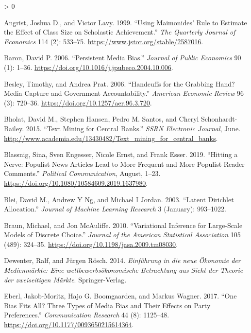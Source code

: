 \documentclass[
  12pt,
]{article}
\newlength{\cslhangindent}
\newenvironment{CSLReferences}[2] %
 {%
  \setlength{\parindent}{0pt}
  \ifodd #1 \everypar{\setlength{\hangindent}{\cslhangindent}}\ignorespaces\fi
  \ifnum #2 > 0
  \setlength{\parskip}{#2\baselineskip}
  \fi
 }%
 {}
\begin{document}
\hypertarget{refs}{}
\begin{CSLReferences}{1}{0}
\leavevmode\hypertarget{ref-angrist_using_1999}{}%
Angrist, Joshua D., and Victor Lavy. 1999. {``Using Maimonides' Rule to
Estimate the Effect of Class Size on Scholastic Achievement.''}
\emph{The Quarterly Journal of Economics} 114 (2): 533--75.
\url{https://www.jstor.org/stable/2587016}.

\leavevmode\hypertarget{ref-baron_persistent_2006}{}%
Baron, David P. 2006. {``Persistent Media Bias.''} \emph{Journal of
Public Economics} 90 (1): 1--36.
\url{https://doi.org/10.1016/j.jpubeco.2004.10.006}.

\leavevmode\hypertarget{ref-besley_handcuffs_2006}{}%
Besley, Timothy, and Andrea Prat. 2006. {``Handcuffs for the Grabbing
Hand? Media Capture and Government Accountability.''} \emph{American
Economic Review} 96 (3): 720--36.
\url{https://doi.org/10.1257/aer.96.3.720}.

\leavevmode\hypertarget{ref-bholat_text_2015}{}%
Bholat, David M., Stephen Hansen, Pedro M. Santos, and Cheryl
Schonhardt-Bailey. 2015. {``Text Mining for Central Banks.''}
\emph{{SSRN} Electronic Journal}, June.
\url{http://www.academia.edu/13430482/Text_mining_for_central_banks}.

\leavevmode\hypertarget{ref-blassnig_hitting_2019}{}%
Blassnig, Sina, Sven Engesser, Nicole Ernst, and Frank Esser. 2019.
{``Hitting a Nerve: Populist News Articles Lead to More Frequent and
More Populist Reader Comments.''} \emph{Political Communication},
August, 1--23. \url{https://doi.org/10.1080/10584609.2019.1637980}.

\leavevmode\hypertarget{ref-blei_latent_2003}{}%
Blei, David M., Andrew Y Ng, and Michael I Jordan. 2003. {``Latent
Dirichlet Allocation.''} \emph{Journal of Machine Learning Research} 3
(January): 993--1022.

\leavevmode\hypertarget{ref-braun_variational_2010}{}%
Braun, Michael, and Jon McAuliffe. 2010. {``Variational Inference for
Large-Scale Models of Discrete Choice.''} \emph{Journal of the American
Statistical Association} 105 (489): 324--35.
\url{https://doi.org/10.1198/jasa.2009.tm08030}.

\leavevmode\hypertarget{ref-dewenter_einfuhrung_2014}{}%
Dewenter, Ralf, and Jürgen Rösch. 2014. \emph{Einführung in die neue
Ökonomie der Medienmärkte: Eine wettbewerbsökonomische Betrachtung aus
Sicht der Theorie der zweiseitigen Märkte}. Springer-Verlag.

\leavevmode\hypertarget{ref-eberl_one_2017}{}%
Eberl, Jakob-Moritz, Hajo G. Boomgaarden, and Markus Wagner. 2017.
{``One Bias Fits All? Three Types of Media Bias and Their Effects on
Party Preferences.''} \emph{Communication Research} 44 (8): 1125--48.
\url{https://doi.org/10.1177/0093650215614364}.


\end{CSLReferences}
\end{document}
